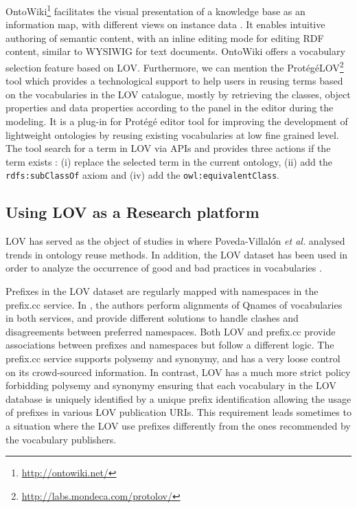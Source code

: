 \documentclass{iosart2c}
\begin{document}
OntoWiki\footnote{\url{http://ontowiki.net/}} facilitates the visual presentation of a knowledge base as an information map, with different views on instance data \cite{auer2006ontowiki}. It enables intuitive authoring of semantic content, with an inline editing mode for editing RDF content, similar to WYSIWIG for text documents. OntoWiki offers a vocabulary selection feature based on LOV.
Furthermore, we can mention the Prot{\'e}g{\'e}LOV\footnote{\url{http://labs.mondeca.com/protolov/}} tool which provides a technological support to help users in reusing terms based on the vocabularies in the LOV catalogue, mostly by retrieving the classes, object properties and data properties according to the panel in the editor during the modeling. It is a plug-in for Prot{\'e}g{\'e} editor tool \cite{prolov2015} for improving the development of lightweight ontologies by reusing existing vocabularies at low fine grained level. The tool search for a term in LOV via APIs and provides three actions if the term exists : (i) replace the selected term in the current ontology, (ii) add the \texttt{rdfs:subClassOf} axiom and (iv) add the \texttt{owl:equivalentClass}.


\subsection{Using LOV as a Research platform}

LOV has served as the object of studies in \cite{poveda2012landscape} where Poveda-Villal\'on \emph{et al.} analysed trends in ontology reuse methods. In addition, the LOV dataset has been used in order to analyze the occurrence of good and bad practices in vocabularies \cite{poveda2013detecting}.

Prefixes in the LOV dataset are regularly mapped with namespaces in the prefix.cc service. In \cite{wasabi13}, the authors perform alignments of Qnames of vocabularies in both services, and provide different solutions to handle clashes and disagreements between preferred namespaces. Both  LOV and prefix.cc provide associations between prefixes and namespaces but follow a different logic. The prefix.cc service supports polysemy and synonymy, and has a very loose control on its crowd-sourced information. In contrast, LOV has a much more strict policy forbidding polysemy and synonymy ensuring that each vocabulary in the LOV database is uniquely identified by a unique prefix identification allowing the usage of prefixes in various LOV publication URIs. This requirement leads sometimes to a situation where the LOV use prefixes differently from the ones recommended by the vocabulary publishers.
\end{document}
